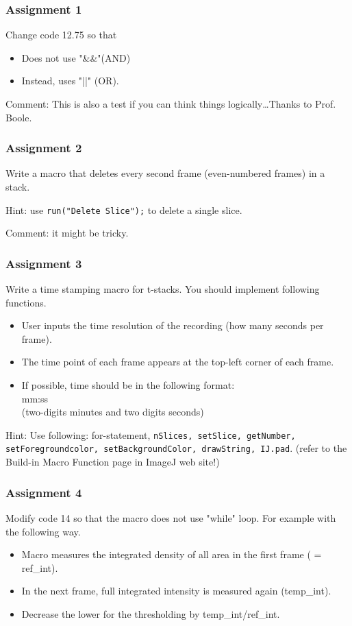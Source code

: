 \documentclass[11pt,a4paper,oneside]{report}
\newcommand{\ilcom}[1]{\texttt{\small#1}}
\begin{document}
\subsubsection{Assignment 1}
Change code 12.75 so that 
\begin{itemize}
\item Does not use "\&\&"(AND) 
\item Instead, uses "||" (OR). 
\end{itemize}

Comment: This is also a test if you can think things logically\ldots Thanks to Prof. Boole. 

\subsubsection{Assignment 2}  
Write a macro that deletes every second frame (even-numbered frames) in a stack. 

Hint: use \ilcom{run("Delete Slice");} to delete a single slice. 

Comment: it might be tricky.

\subsubsection{Assignment 3} 
Write a time stamping macro for t-stacks. You should implement following functions. 
\begin{itemize}
\item User inputs the time resolution of the recording (how many seconds per frame).
\item The time point of each frame appears at the top-left corner of each frame.  
\item If possible, time should be in the following format: \\
mm:ss \\
(two-digits minutes and two digits seconds)
\end{itemize}
Hint: Use following: for-statement, 
\ilcom{nSlices, setSlice, getNumber,\\ setForegroundcolor, setBackgroundColor,
drawString, IJ.pad}. (refer to the Build-in Macro Function page in ImageJ web
site!)

\subsubsection{Assignment 4} 
Modify code 14 so that the macro does not use "while" loop. For example with the following way. 
\begin{itemize}
\item Macro measures the integrated density of all area in the first frame ( = ref\_int).
\item In the next frame, full integrated intensity is measured again (temp\_int).
\item Decrease the lower for the thresholding by temp\_int/ref\_int.
 \end{itemize}
\end{document}
